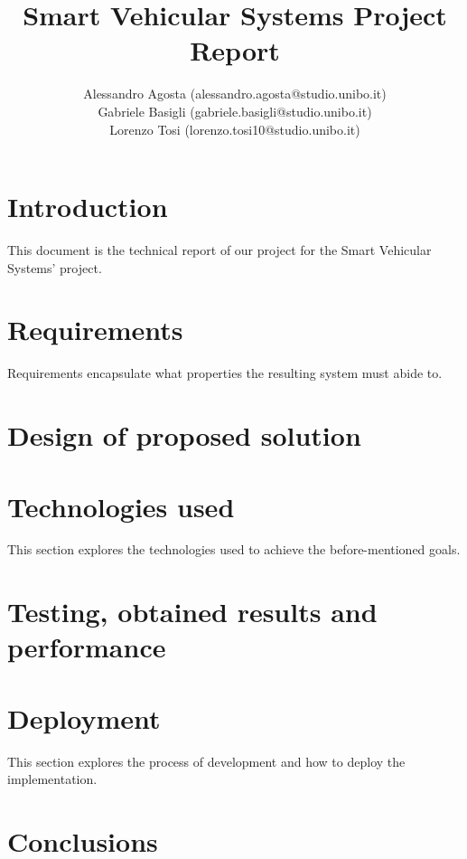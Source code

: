 \documentclass{report}
\title{Smart Vehicular Systems Project Report}
\author{
Alessandro Agosta (alessandro.agosta@studio.unibo.it)\\
Gabriele Basigli (gabriele.basigli@studio.unibo.it)\\
Lorenzo Tosi (lorenzo.tosi10@studio.unibo.it)
}
\begin{document}
\maketitle
\newpage
\tableofcontents
\newpage
\chapter{Introduction}
This document is the technical report of our project for the Smart Vehicular Systems' project.\\

\chapter{Requirements}
Requirements encapsulate what properties the resulting system must abide to.\\

\chapter{Design of proposed solution}

\chapter{Technologies used}
This section explores the technologies used to achieve the before-mentioned goals.\\

\chapter{Testing, obtained results and performance}

\chapter{Deployment}
This section explores the process of development and how to deploy the implementation.\\

\chapter{Conclusions}

\end{document}
